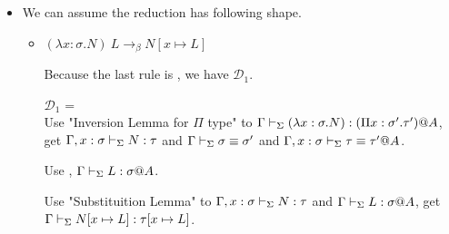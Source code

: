 \begin{itemize}
	\newcommand{\LB}{\longrightarrow_{\beta}}
												
	\item \TApp
	      	      	      	      	      	      		      	      	      	      	      
	      We can assume the reduction has following shape.
	      	      	      	      	      	      		      	      	      	      	      
	      \begin{itemize}
	      	\item $(\lambda x:\sigma.N)\ L \LB N[x\mapsto L]$
	      	      	      	      	      	      	      	      	      	      	      	      		      	      	      	      	      	      	      	      	      	      
	      	      Because the last rule is \TApp, we have $\mathcal{D}_1$.
	      	      	      	      	      	      	      	      	      	      	      	      		      	      	      	      	      	      	      	      	      	      
	      	      $\mathcal{D}_1$ = 
	      	      { \andalso {}} \\
	      	      	      	      	      	      	      	      	      	      	      	      		      	      	      	      	      	      	      	      	      	      
	      	      Use "Inversion Lemma for $\Pi$ type" to $\Gamma \vdash_\Sigma (\lambda x:\sigma.N) : (\Pi x:\sigma'.\tau')@A$,\\
	      	      get $\Gamma, x:\sigma \vdash_\Sigma N:\tau$ and $\Gamma \vdash_\Sigma \sigma \equiv \sigma'$ and $\Gamma ,x:\sigma \vdash_\Sigma \tau \equiv \tau'@A$.
	      	      	      	      	      	      	      	      	      	      	      	      		      	      	      	      	      	      	      	      	      	      
	      	      Use \TConv, $\Gamma \vdash_\Sigma L:\sigma @A$.
	      	      	      	      	      	      	      	      	      	      	      	      		      	      	      	      	      	      	      	      	      	      
	      	      Use "Substituition Lemma" to $\Gamma, x:\sigma \vdash_\Sigma N:\tau$ and $\Gamma \vdash_\Sigma L:\sigma @A$, get $\Gamma \vdash_\Sigma N[x\mapsto L]:\tau[x\mapsto L]$.
	      	      	      	      	      	      	      	      	      	      	      	      		      	      	      	      	      	      	      	      	      	      

\end{itemize}
\end{itemize}
